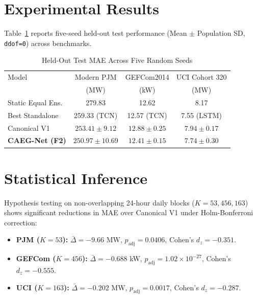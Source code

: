 \documentclass[journal,10pt,twocolumn]{IEEEtran}
\begin{document}
\section{Experimental Results}
Table~\ref{tab:results} reports five-seed held-out test performance (Mean $\pm$ Population SD, \texttt{ddof=0}) across benchmarks.

\begin{table}[htbp]
\caption{Held-Out Test MAE Across Five Random Seeds}
\label{tab:results}
\centering
\begin{tabular}{lccc}
\toprule
Model & Modern PJM & GEFCom2014 & UCI Cohort 320 \\
 & (MW) & (kW) & (MW) \\
\midrule
Static Equal Ens. & 279.83 & 12.62 & 8.17 \\
Best Standalone & 259.33 (TCN) & 12.57 (TCN) & 7.55 (LSTM) \\
Canonical V1 & $253.41 \pm 9.12$ & $12.88 \pm 0.25$ & $7.94 \pm 0.17$ \\
\textbf{CAEG-Net (F2)} & $\mathbf{250.97 \pm 10.69}$ & $\mathbf{12.41 \pm 0.15}$ & $\mathbf{7.74 \pm 0.30}$ \\
\bottomrule
\end{tabular}
\end{table}

\section{Statistical Inference}
Hypothesis testing on non-overlapping 24-hour daily blocks ($K=53, 456, 163$) shows significant reductions in MAE over Canonical V1 under Holm-Bonferroni correction:
\begin{itemize}
    \item \textbf{PJM ($K=53$):} $\bar{\Delta} = -9.66$ MW, $p_{\mathrm{adj}} = 0.0406$, Cohen's $d_z = -0.351$.
    \item \textbf{GEFCom ($K=456$):} $\bar{\Delta} = -0.688$ kW, $p_{\mathrm{adj}} = 1.02 \times 10^{-27}$, Cohen's $d_z = -0.555$.
    \item \textbf{UCI ($K=163$):} $\bar{\Delta} = -0.202$ MW, $p_{\mathrm{adj}} = 0.0017$, Cohen's $d_z = -0.287$.
\end{itemize}
\end{document}
